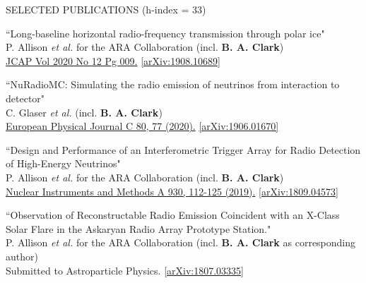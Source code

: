 \documentclass{resume} %
\begin{document}
\begin{rSection}{SELECTED PUBLICATIONS (h-index = 33)}
\begin{etaremune}

  \item ``Long-baseline horizontal radio-frequency transmission through polar ice" \\
 P. Allison {\it et al.} for the ARA Collaboration (incl. \textbf{B. A. Clark})\\    \href{https://iopscience.iop.org/article/10.1088/1475-7516/2020/12/009}{JCAP Vol 2020 No 12 Pg 009.} \href{https://arxiv.org/abs/1908.10689}{[arXiv:1908.10689]}

  \item ``NuRadioMC: Simulating the radio emission of neutrinos from interaction to detector" \\
 C. Glaser {\it et al.} (incl. \textbf{B. A. Clark})\\     \href{https://doi.org/10.1140/epjc/s10052-020-7612-8}{European Physical Journal C 80, 77 (2020).} \href{https://arxiv.org/abs/1906.01670}{[arXiv:1906.01670]}
 

  \item ``Design and Performance of an Interferometric Trigger Array for Radio Detection of High-Energy Neutrinos" \\
 P. Allison {\it et al.} for the ARA Collaboration (incl. \textbf{B. A. Clark}) \\    \href{https://doi.org/10.1016/j.nima.2019.01.067}{Nuclear Instruments and Methods A 930, 112-125 (2019).}  \href{https://arxiv.org/abs/1809.04573}{[arXiv:1809.04573]}
 

 \item ``Observation of Reconstructable Radio Emission Coincident with an X-Class Solar Flare in the Askaryan Radio Array Prototype Station." \\
P. Allison {\it et al.} for the ARA Collaboration (incl. \textbf{B. A. Clark} as corresponding author) \\
 Submitted to Astroparticle Physics. \href{https://arxiv.org/abs/1807.03335}{[arXiv:1807.03335]}
 

\end{etaremune}
\end{rSection}
\end{document}
